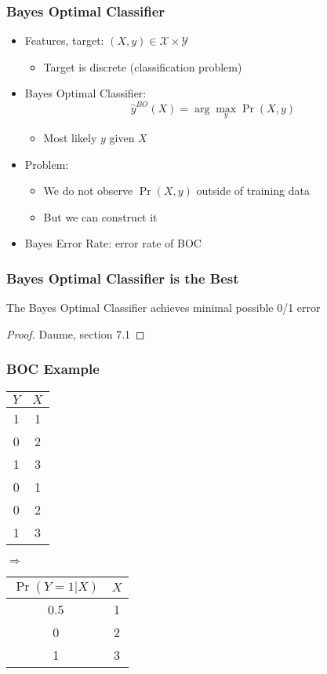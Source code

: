 \documentclass[mathserif, xcolor=table, svgnames]{beamer}
\begin{document}
\begin{frame}
  \frametitle{Bayes Optimal Classifier}
  \begin{itemize}
  \item Features, target: $(X, y) \in \mathcal{X} \times \mathcal{Y}$
    \begin{itemize}
    \item Target is discrete (classification problem)
    \end{itemize}
  \item Bayes Optimal Classifier:
    \begin{equation*}
      \hat y^{BO}(X) = \arg\max_{y} \Pr(X, y)
    \end{equation*}
    \begin{itemize}
    \item Most likely $y$ given $X$
    \end{itemize}
    \pause
  \item Problem:
    \begin{itemize}
    \item We do not observe $\Pr(X, y)$ outside of training data
    \item But we can construct it \smiley
    \end{itemize}
  \item Bayes Error Rate: error rate of BOC
  \end{itemize}
\end{frame}

\begin{frame}
  \frametitle{Bayes Optimal Classifier is the Best}
  \begin{theorem}
    The Bayes Optimal Classifier achieves minimal possible 0/1 error
    \begin{proof}
      Daume, section 7.1
    \end{proof}
  \end{theorem}
\end{frame}

\begin{frame}
  \frametitle{BOC Example}
  \begin{center}
    \begin{tabular}[c]{|c|c|}
      \toprule
      $Y$ & $X$\\
      \midrule
      1 & 1\\
      0 & 2\\
      1 & 3\\
      0 & 1\\
      0 & 2\\
      1 & 3\\
      \bottomrule
    \end{tabular}
    \qquad$\Rightarrow$\qquad
    \begin{tabular}[c]{|c|c|}
      \toprule
      $\Pr(Y = 1|X)$ & $X$\\
      \midrule
      0.5 & 1\\
      0 & 2\\
      1 & 3\\
      \bottomrule
    \end{tabular}
  \end{center}
\end{frame}
\end{document}
